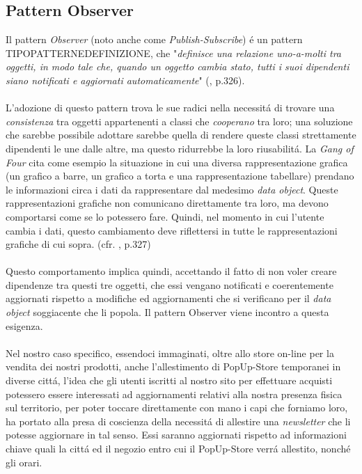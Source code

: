 \documentclass[12pt]{article}
\begin{document}
\subsection{Pattern Observer}

Il pattern \textit{Observer} (noto anche come \textit{Publish-Subscribe}) \'e un pattern TIPOPATTERNEDEFINIZIONE, che "\textit{definisce una relazione uno-a-molti tra oggetti, in modo tale che, quando un oggetto cambia stato, tutti i suoi dipendenti siano notificati e aggiornati automaticamente}" (\cite{gof_riferimento}, p.326). 
\\
\\
L'adozione di questo pattern trova le sue radici nella necessit\'a di trovare una \textit{consistenza} tra oggetti appartenenti a classi che \textit{cooperano} tra loro; una soluzione che sarebbe possibile adottare sarebbe quella di rendere queste classi strettamente dipendenti le une dalle altre, ma questo ridurrebbe la loro riusabilit\'a. La \textit{Gang of Four} cita come esempio la situazione in cui una diversa rappresentazione grafica (un grafico a barre, un grafico a torta e una rappresentazione tabellare) prendano le informazioni circa i dati da rappresentare dal medesimo \textit{data object}. Queste rappresentazioni grafiche non comunicano direttamente tra loro, ma devono comportarsi come se lo potessero fare. Quindi, nel momento in cui l'utente cambia i dati, questo cambiamento deve riflettersi in tutte le rappresentazioni grafiche di cui sopra. (cfr. \cite{gof_riferimento}, p.327)
\\
\\
Questo comportamento implica quindi, accettando il fatto di non voler creare dipendenze tra questi tre oggetti, che essi vengano notificati e coerentemente aggiornati rispetto a modifiche ed aggiornamenti che si verificano per il \textit{data object} soggiacente che li popola. Il pattern Observer viene incontro a questa esigenza. 
\\
\\
Nel nostro caso specifico, essendoci immaginati, oltre allo store on-line per la vendita dei nostri prodotti, anche l'allestimento di PopUp-Store temporanei in diverse citt\'a, l'idea che gli utenti iscritti al nostro sito per effettuare acquisti potessero essere interessati ad aggiornamenti relativi alla nostra presenza fisica sul territorio, per poter toccare direttamente con mano i capi che forniamo loro, ha portato alla presa di coscienza della necessit\'a di allestire una \textit{newsletter} che li potesse aggiornare in tal senso. Essi saranno aggiornati rispetto ad informazioni chiave quali la citt\'a ed il negozio entro cui il PopUp-Store verr\'a allestito, nonch\'e gli orari. 
\end{document}
